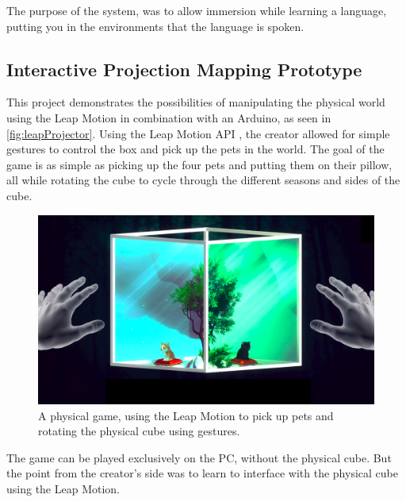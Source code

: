     The purpose of the system, was to allow immersion while learning a language, putting you in the environments that the language is spoken.
    
    	\subsection{Interactive Projection Mapping Prototype} %
	    This project demonstrates the possibilities of manipulating the physical world using the Leap Motion in combination with an Arduino, as seen in \autoref{fig:leapProjector}. Using the Leap Motion API , the creator allowed for simple gestures to control the box and pick up the pets in the world. The goal of the game is as simple as picking up the four pets and putting them on their pillow, all while rotating the cube to cycle through the different seasons and sides of the cube\cite{leapMotionProjectionMapping}.
	    \begin{figure}[H]
	    	\centering
	    	\includegraphics[width=0.8\linewidth]{figure/Analysis/LeapProjector.png}
	    	\caption{A physical game, using the Leap Motion to pick up pets and rotating the physical cube using gestures\cite{leapMotionProjectionMapping}.}
	    	\label{fig:leapProjector}
	    \end{figure}
    The game can be played exclusively on the PC, without the physical cube. But the point from the creator's side was to learn to interface with the physical cube using the Leap Motion.


